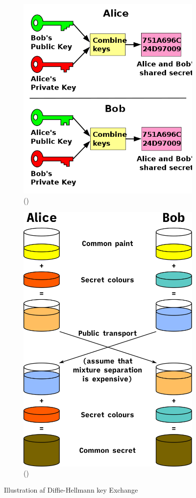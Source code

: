 \begin{figure}[htbp]
\centering
\begin{subfigure}{.5\textwidth}
  \centering
  \includegraphics[width=0.9\linewidth]{images/Public_key_shared_secret.svg.png}
  \caption{(\cite{gothberg_2006})}
  \label{fig:sub1}
\end{subfigure}%
\begin{subfigure}{.5\textwidth}
  \centering
  \includegraphics[width=0.7\linewidth]{images/1024px-Diffie-Hellman_Key_Exchange.svg.png}
  \caption{(\cite{Avinck_2011})}
  \label{fig:sub2}
\end{subfigure}
\caption{Illustration af Diffie-Hellmann key Exchange}
\end{figure}

